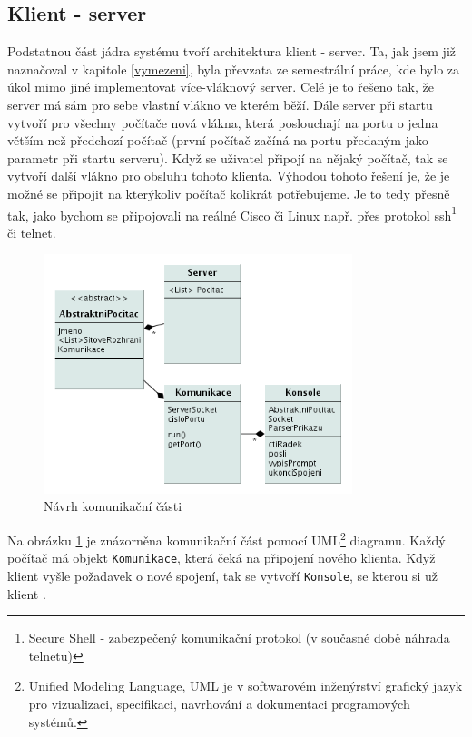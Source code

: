 \subsection{Klient - server}
Podstatnou část jádra systému tvoří architektura klient - server. Ta, jak jsem již naznačoval v kapitole \ref{vymezeni}, byla převzata ze semestrální práce, kde bylo za úkol mimo jiné implementovat více-vláknový server. Celé je to řešeno tak, že server má sám pro sebe vlastní vlákno ve kterém běží. Dále server při startu vytvoří pro všechny počítače nová vlákna, která poslouchají na portu o jedna větším než předchozí počítač (první počítač začíná na portu předaným jako parametr při startu serveru). Když se uživatel připojí na nějaký počítač, tak se vytvoří další vlákno pro obsluhu tohoto klienta. Výhodou tohoto řešení je, že je možné se připojit na kterýkoliv počítač kolikrát potřebujeme. Je to tedy přesně tak, jako bychom se připojovali na reálné Cisco či Linux např. přes protokol ssh\footnote{Secure Shell - zabezpečený komunikační protokol (v současné době náhrada telnetu)} či telnet.

\begin{figure}[h]
\begin{center}
\includegraphics[width=9cm]{figures/uml_sit2}
\caption{Návrh komunikační části}
\label{fig:sit}
\end{center}
\end{figure}

Na obrázku \ref{fig:sit} je znázorněna komunikační část pomocí UML\footnote{Unified Modeling Language, UML je v softwarovém inženýrství grafický jazyk pro vizualizaci, specifikaci, navrhování a dokumentaci programových systémů.\cite{wiki:uml}} diagramu. Každý počítač má objekt \verb|Komunikace|, která čeká na připojení nového klienta. Když klient vyšle požadavek o nové spojení, tak se vytvoří \verb|Konsole|, se kterou si už klient .

